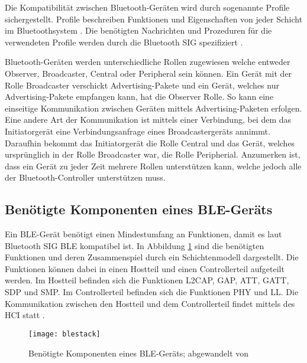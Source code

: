 Die Kompatibilität zwischen Bluetooth-Geräten wird durch sogenannte Profile sichergestellt. Profile beschreiben Funktionen und Eigenschaften von jeder Schicht im Bluetoothsystem \cite[S.~277]{bluetoothCore}. Die benötigten Nachrichten und Prozeduren für die verwendeten Profile werden durch die Bluetooth \ac{SIG} spezifiziert \cite[S.~1241]{bluetoothCore}.

Bluetooth-Geräten werden unterschiedliche Rollen zugewiesen welche entweder Observer, Broadcaster, Central oder Peripheral sein können. Ein Gerät mit der Rolle Broadcaster verschickt Advertising-Pakete und ein Gerät, welches nur Advertising-Pakete empfangen kann, hat die Observer Rolle. So kann eine einseitige Kommunikation zwischen Geräten mittels Advertising-Paketen erfolgen. Eine andere Art der Kommunikation ist mittels einer Verbindung, bei dem das Initiatorgerät eine Verbindungsanfrage eines Broadcastergeräts annimmt. Daraufhin bekommt das Initiatorgerät die Rolle Central und das Gerät, welches ursprünglich in der Rolle Broadcaster war, die Rolle Peripherial. Anzumerken ist, dass ein Gerät zu jeder Zeit mehrere Rollen unterstützen kann, welche jedoch alle der Bluetooth-Controller unterstützen muss. \cite[S.~190f., S.~278, S.~1246ff.]{bluetoothCore}

\subsection{Benötigte Komponenten eines \ac{BLE}-Geräts}

Ein \ac{BLE}-Gerät benötigt einen Mindestumfang an Funktionen, damit es laut Bluetooth \ac{SIG} \ac{BLE} kompatibel ist. In Abbildung \ref{fig:blestack} sind die benötigten Funktionen und deren Zusammenspiel durch ein Schichtenmodell dargestellt. Die Funktionen können dabei in einen Hostteil und einen Controllerteil aufgeteilt werden. Im Hostteil befinden sich die Funktionen \ac{L2CAP}, \ac{GAP}, \ac{ATT}, \ac{GATT}, \ac{SDP} und \ac{SMP}. Im Controllerteil befinden sich die Funktionen \ac{PHY} und \ac{LL}. Die Kommunikation zwischen den Hostteil und dem Controllerteil findet mittels des \ac{HCI} statt \cite[S.~1735]{bluetoothCore}. \cite[S.~193]{bluetoothCore}

\begin{figure}[h]
    \centering
    \texttt{[image: blestack]}
    \caption{Benötigte Komponenten eines \acs{BLE}-Geräts; abgewandelt von \cite[S.~203, S.~1245]{bluetoothCore}}
    \label{fig:blestack}
\end{figure}

